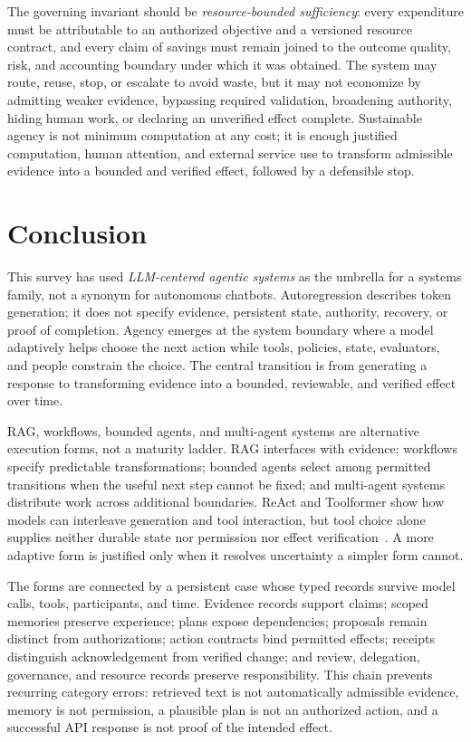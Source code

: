 The governing invariant should be \emph{resource-bounded sufficiency}: every expenditure must be attributable to an authorized objective and a versioned resource contract, and every claim of savings must remain joined to the outcome quality, risk, and accounting boundary under which it was obtained. The system may route, reuse, stop, or escalate to avoid waste, but it may not economize by admitting weaker evidence, bypassing required validation, broadening authority, hiding human work, or declaring an unverified effect complete. Sustainable agency is not minimum computation at any cost; it is enough justified computation, human attention, and external service use to transform admissible evidence into a bounded and verified effect, followed by a defensible stop.

\section{Conclusion}
\label{sec:conclusion}

This survey has used \emph{LLM-centered agentic systems} as the umbrella for a systems family, not a synonym for autonomous chatbots. Autoregression describes token generation; it does not specify evidence, persistent state, authority, recovery, or proof of completion. Agency emerges at the system boundary where a model adaptively helps choose the next action while tools, policies, state, evaluators, and people constrain the choice. The central transition is from generating a response to transforming evidence into a bounded, reviewable, and verified effect over time.

RAG, workflows, bounded agents, and multi-agent systems are alternative execution forms, not a maturity ladder. RAG interfaces with evidence; workflows specify predictable transformations; bounded agents select among permitted transitions when the useful next step cannot be fixed; and multi-agent systems distribute work across additional boundaries. ReAct and Toolformer show how models can interleave generation and tool interaction, but tool choice alone supplies neither durable state nor permission nor effect verification~\cite{yao2023react,schick2023toolformer}. A more adaptive form is justified only when it resolves uncertainty a simpler form cannot.

The forms are connected by a persistent case whose typed records survive model calls, tools, participants, and time. Evidence records support claims; scoped memories preserve experience; plans expose dependencies; proposals remain distinct from authorizations; action contracts bind permitted effects; receipts distinguish acknowledgement from verified change; and review, delegation, governance, and resource records preserve responsibility. This chain prevents recurring category errors: retrieved text is not automatically admissible evidence, memory is not permission, a plausible plan is not an authorized action, and a successful API response is not proof of the intended effect.

